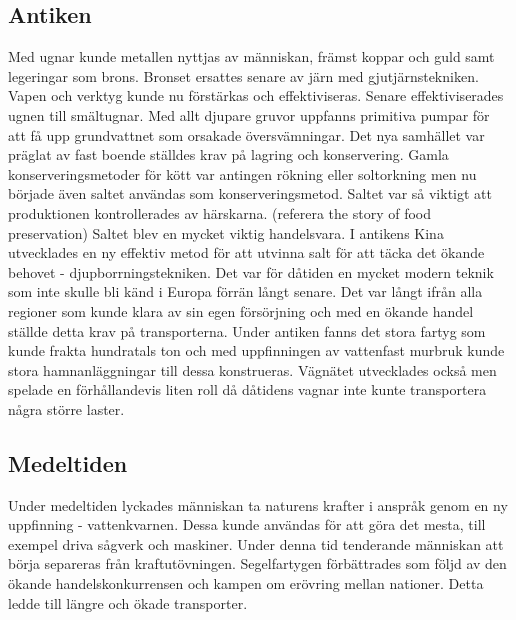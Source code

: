 \subsection{Antiken}
Med ugnar kunde metallen nyttjas av människan, främst koppar och guld samt legeringar som brons. Bronset ersattes senare av järn med gjutjärnstekniken. Vapen och verktyg kunde nu förstärkas och effektiviseras. Senare effektiviserades ugnen till smältugnar. Med allt djupare gruvor uppfanns primitiva pumpar för att få upp grundvattnet som orsakade översvämningar. \citep{denskapande}
\newline
\newline 
Det nya samhället var präglat av fast boende ställdes krav på lagring och konservering. \citep{denskapande}
\newline
\newline
Gamla konserveringsmetoder för kött var antingen rökning eller soltorkning men nu började även saltet användas som konserveringsmetod. Saltet var så viktigt att produktionen kontrollerades av härskarna. 
(referera the story of food preservation) 
\newline
\newline
Saltet blev en mycket viktig handelsvara. I antikens Kina utvecklades en ny effektiv metod för att utvinna salt för att täcka det ökande behovet - djupborrningstekniken. Det var för dåtiden en mycket modern teknik som inte skulle bli känd i Europa förrän långt senare. \citep{denskapande}
\newline
\newline
Det var långt ifrån alla regioner som kunde klara av sin egen försörjning och med en ökande handel ställde detta krav på transporterna. Under antiken fanns det stora fartyg som kunde frakta hundratals ton och med uppfinningen av vattenfast murbruk kunde stora hamnanläggningar till dessa konstrueras. Vägnätet utvecklades också men spelade en förhållandevis liten roll då dåtidens vagnar inte kunte transportera några större laster. \citep{denskapande}

\subsection{Medeltiden}    
Under medeltiden lyckades människan ta naturens krafter i anspråk genom en ny uppfinning - vattenkvarnen. Dessa kunde användas för att göra det mesta, till exempel driva sågverk och maskiner. Under denna tid tenderande människan att börja separeras från kraftutövningen. \citep{medeltiden}
\newline
\newline
Segelfartygen förbättrades som följd av den ökande handelskonkurrensen och kampen om erövring mellan nationer. Detta ledde till längre och ökade transporter. \citep{denskapande}

